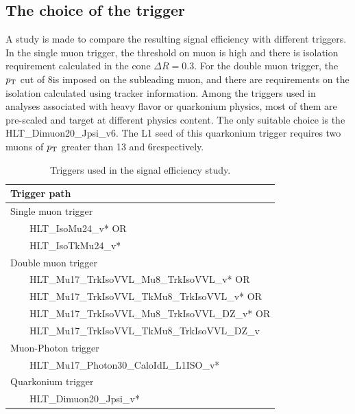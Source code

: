 		\subsection*{The choice of the trigger}
		A study is made to compare the resulting signal efficiency with different triggers.
		In the single muon trigger, the \pt threshold on muon is high and there is isolation requirement calculated in the cone $\Delta R=0.3$. For the double muon trigger, the $p_{\mathrm{T}}$ cut of 8\GeV is imposed on the subleading muon, and there are requirements on the isolation calculated using tracker information. 
		Among the triggers used in analyses associated with heavy flavor or quarkonium physics, most of them are pre-scaled and target at different physics content. The only suitable choice is the HLT\_Dimuon20\_Jpsi\_v6. The L1 seed of this quarkonium trigger requires two muons of $p_{\mathrm{T}}$ greater than 13 and 6\GeV respectively.  
		
		\begin{table}[!ht]
		\begin{center}
		\begin{tabular}{| l |} 
		\hline
		Trigger path \\ 
		\hline
		Single muon trigger \\
		~~~~HLT\_IsoMu24\_v* OR \\
		~~~~HLT\_IsoTkMu24\_v* \\
		Double muon trigger \\
		~~~~HLT\_Mu17\_TrkIsoVVL\_Mu8\_TrkIsoVVL\_v* OR \\
		~~~~HLT\_Mu17\_TrkIsoVVL\_TkMu8\_TrkIsoVVL\_v* OR \\
		~~~~HLT\_Mu17\_TrkIsoVVL\_Mu8\_TrkIsoVVL\_DZ\_v* OR \\
		~~~~HLT\_Mu17\_TrkIsoVVL\_TkMu8\_TrkIsoVVL\_DZ\_v \\
		Muon-Photon trigger \\
		~~~~HLT\_Mu17\_Photon30\_CaloIdL\_L1ISO\_v* \\
		Quarkonium trigger \\
		~~~~HLT\_Dimuon20\_Jpsi\_v* \\
		\hline
		\end{tabular}
		\caption{Triggers used in the signal efficiency study. \label{table:vartrigs}}
		\end{center}                                                                                                                                       
		\end{table} 
		
